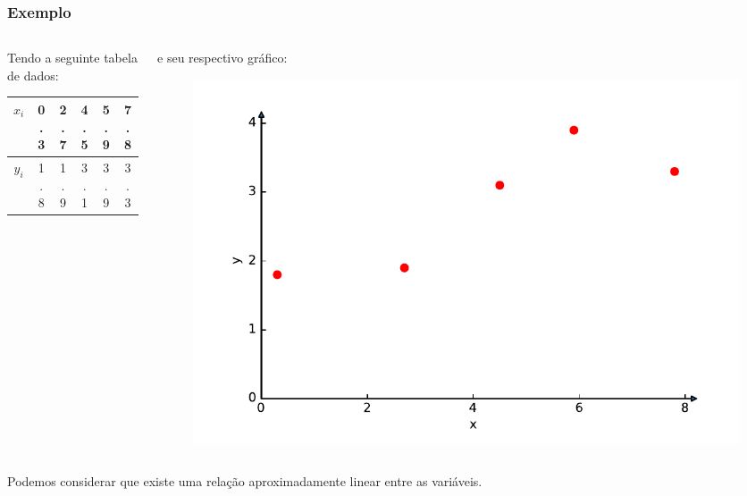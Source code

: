 \documentclass{beamer}
\theoremstyle{mystyle}
\begin{document}
	\begin{frame}
		\frametitle{Exemplo}
		\begin{columns}
			\begin{column}{0.5\textwidth} 
				Tendo a seguinte tabela de dados:
				\begin{table}
					\small 
					\centering
					\begin{tabular}{c|ccccc}
						$ x_{i} $ & 0.3 & 2.7 & 4.5 & 5.9 & 7.8 \\
						\hline
						$ y_{i} $ & 1.8 & 1.9 & 3.1 & 3.9 & 3.3  
					\end{tabular}
				\end{table}
			\end{column}
			\begin{column}{0.5\textwidth}
				e seu respectivo gráfico:	
				\begin{figure}
					\centering
					\includegraphics[width=1.0\linewidth]{Figuras/grafico_02}
					\label{fig:grafico02}
				\end{figure}
			\end{column}
		\end{columns}
		Podemos considerar que existe uma relação aproximadamente linear entre as variáveis.
	\end{frame}
\end{document}
